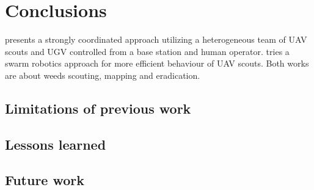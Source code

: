 

    \chapter{Conclusions}

    \cite{deSantos2016} presents a strongly coordinated approach utilizing a heterogeneous team of UAV scouts and UGV controlled from a base station and human operator.\cite{Albani2017} tries a swarm robotics approach for more efficient behaviour of UAV scouts. Both works are about weeds scouting, mapping and eradication.
            
    \section{Limitations of previous work}

    \section{Lessons learned}

    \section{Future work} 

 
